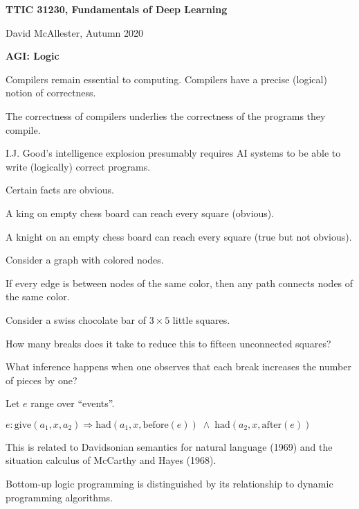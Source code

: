




{\Huge

  \centerline{\bf TTIC 31230, Fundamentals of Deep Learning}
  \bigskip
  \centerline{David McAllester, Autumn 2020}

\vfill
  \centerline{\bf AGI: Logic}
  \vfill
  \vfill


Compilers remain essential to computing.  Compilers have a precise (logical) notion of correctness.

\vfill
The correctness of compilers underlies the correctness of the programs they compile.

\vfill
I.J. Good's intelligence explosion presumably requires AI systems to be able to write (logically) correct programs.


Certain facts are obvious.

\vfill
A king on empty chess board can reach every square (obvious).

\vfill
A knight on an empty chess board can reach every square (true but not obvious).


Consider a graph with colored nodes.

\vfill
If every edge is between nodes of the same color, then any path connects nodes of the same color.

\vfill
Consider a swiss chocolate bar of $3 \times 5$ little squares.

\vfill
How many breaks does it take to reduce this to fifteen unconnected squares?

\vfill
What inference happens when one observes that each break increases the number of pieces by one?


Let $e$ range over ``events''.

\vfill
$e:\mathrm{give}(a_1,x,a_2) \Rightarrow \mathrm{had}(a_1,x,\mathrm{before}(e)) \;\wedge\; \mathrm{had}(a_2,x,\mathrm{after}(e))$

\vfill
This is related to Davidsonian semantics for natural language (1969) and the situation calculus of McCarthy and Hayes (1968).


Bottom-up logic programming is distinguished by its relationship to dynamic programming algorithms.

}
